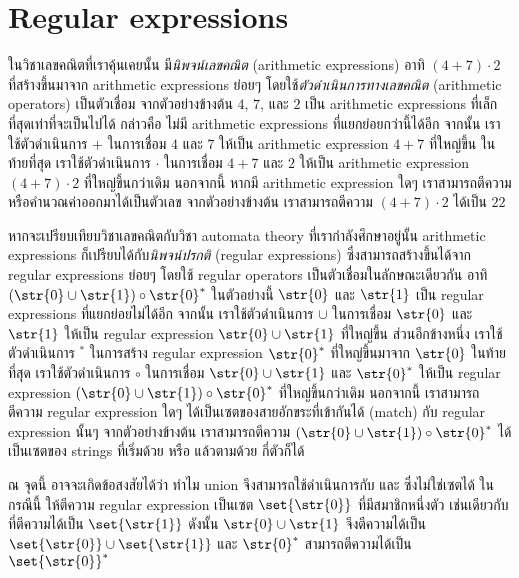 \section{Regular expressions}

ในวิชาเลขคณิตที่เราคุ้นเคยนั้น มี\emph{นิพจน์เลขคณิต} (arithmetic expressions) อาทิ $(4+7)\cdot 2$ ที่สร้างขึ้นมาจาก arithmetic expressions ย่อยๆ โดยใช้\emph{ตัวดำเนินการทางเลขคณิต} (arithmetic operators) เป็นตัวเชื่อม \enskip จากตัวอย่างข้างต้น $4$, $7$, และ $2$ เป็น arithmetic expressions ที่เล็กที่สุดเท่าที่จะเป็นไปได้ กล่าวคือ ไม่มี arithmetic expressions ที่แยกย่อยกว่านี้ได้อีก \enskip จากนั้น เราใช้ตัวดำเนินการ $+$ ในการเชื่อม $4$ และ $7$ ให้เป็น arithmetic expression $4+7$ ที่ใหญ่ขึ้น \enskip ในท้ายที่สุด เราใช้ตัวดำเนินการ $\cdot$ ในการเชื่อม $4+7$ และ $2$ ให้เป็น arithmetic expression $(4+7)\cdot 2$ ที่ใหญ่ขึ้นกว่าเดิม \enskip นอกจากนี้ หากมี arithmetic expression ใดๆ เราสามารถตีความหรือคำนวณค่าออกมาได้เป็นตัวเลข \enskip จากตัวอย่างข้างต้น เราสามารถตีความ $(4+7)\cdot 2$ ได้เป็น $22$

หากจะเปรียบเทียบวิชาเลขคณิตกับวิชา automata theory ที่เรากำลังศึกษาอยู่นั้น arithmetic expressions ก็เปรียบได้กับ\emph{นิพจน์ปรกติ} (regular expressions) ซึ่งสามารถสร้างขึ้นได้จาก regular expressions ย่อยๆ โดยใช้ regular operators เป็นตัวเชื่อมในลักษณะเดียวกัน อาทิ $(\str{0}\cup\str{1})\circ\str{0}^*$ \enskip ในตัวอย่างนี้ $\str{0}$ และ $\str{1}$ เป็น regular expressions ที่แยกย่อยไม่ได้อีก \enskip จากนั้น เราใช้ตัวดำเนินการ $\cup$ ในการเชื่อม $\str{0}$ และ $\str{1}$ ให้เป็น regular expression $\str{0}\cup\str{1}$ ที่ใหญ่ขึ้น \enskip ส่วนอีกข้างหนึ่ง เราใช้ตัวดำเนินการ $^*$ ในการสร้าง regular expression $\str{0}^*$ ที่ใหญ่ขึ้นมาจาก $\str{0}$ \enskip ในท้ายที่สุด เราใช้ตัวดำเนินการ $\circ$ ในการเชื่อม $\str{0}\cup\str{1}$ และ $\str{0}^*$ ให้เป็น regular expression $(\str{0}\cup\str{1})\circ\str{0}^*$ ที่ใหญ่ขึ้นกว่าเดิม \enskip นอกจากนี้ เราสามารถตีความ regular expression ใดๆ ได้เป็นเซตของสายอักขระที่เข้ากันได้ (match) กับ regular expression นั้นๆ \enskip จากตัวอย่างข้างต้น เราสามารถตีความ $(\str{0}\cup\str{1})\circ\str{0}^*$ ได้เป็นเซตของ strings ที่เริ่มด้วย  หรือ  แล้วตามด้วย  กี่ตัวก็ได้

ณ จุดนี้ อาจจะเกิดข้อสงสัยได้ว่า ทำไม union จึงสามารถใช้ดำเนินการกับ  และ  ซึ่งไม่ใช่เซตได้ \enskip ในกรณีนี้ ให้ตีความ regular expression  เป็นเซต $\set{\str{0}}$ ที่มีสมาชิกหนึ่งตัว เช่นเดียวกับ  ที่ตีความได้เป็น $\set{\str{1}}$ \enskip ดังนั้น $\str{0}\cup\str{1}$ จึงตีความได้เป็น $\set{\str{0}}\cup\set{\str{1}}$ และ $\str{0}^*$ สามารถตีความได้เป็น $\set{\str{0}}^*$

